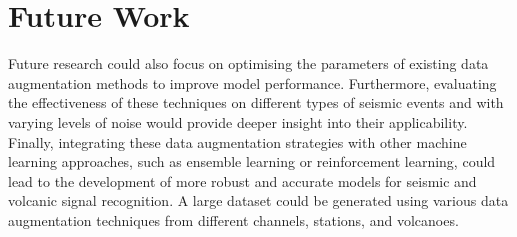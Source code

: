 \documentclass[journal]{IEEEtran}
\begin{document}
\section{Future Work} \label{future_work}
Future research could also focus on optimising the parameters of existing data augmentation methods to improve model performance. Furthermore, evaluating the effectiveness of these techniques on different types of seismic events and with varying levels of noise would provide deeper insight into their applicability. Finally, integrating these data augmentation strategies with other machine learning approaches, such as ensemble learning or reinforcement learning, could lead to the development of more robust and accurate models for seismic and volcanic signal recognition. 
A large dataset could be generated using various data augmentation techniques from different channels, stations, and volcanoes.


%



\end{document}
